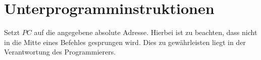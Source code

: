 \section{Unterprogramminstruktionen}







Setzt $PC$ auf die angegebene absolute Adresse. Hierbei ist zu beachten,  dass
nicht in die Mitte eines Befehles gesprungen wird. Dies zu gewährleisten liegt
in der Verantwortung des Programmierers.

